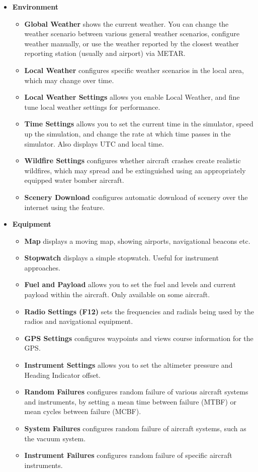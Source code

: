 \begin{itemize}
\item \textbf{Environment}
 \begin{itemize}

  \item \textbf{Global Weather} shows the current weather.
  You can change the weather scenario between various general weather scenarios,
  configure weather manually,
  or use the weather reported by the closest weather reporting station (usually
  and airport) via METAR.
  \item \textbf{Local Weather} configures specific weather scenarios in
  the local area, which may change over time.
  \item \textbf{Local Weather Settings } allows you enable Local Weather, and fine tune local weather
  settings for performance.
  \item \textbf{Time Settings} allows you to set the current
time in the simulator, speed up the simulation, and change the rate at which
time passes in the simulator. Also displays UTC and local time.
  \item \textbf{Wildfire Settings} configures whether aircraft crashes create realistic
  wildfires, which may spread and be extinguished using an appropriately equipped water
  bomber aircraft.
  \item \textbf{Scenery Download} configures automatic download of scenery over the internet
  using the \TerraSync{} feature.
 \end{itemize}

\item \textbf{Equipment}
 \begin{itemize}
  \item \textbf{Map} displays a moving map, showing airports, navigational beacons etc.
  \item \textbf{Stopwatch} displays a simple stopwatch. Useful for instrument
approaches.
  \item \textbf{Fuel and Payload} allows you to
set the fuel and levels and current payload within the aircraft. Only available on
some aircraft.
  \item \textbf{Radio Settings (F12)} sets the frequencies and radials being used by
  the radios and navigational equipment.
  \item \textbf{GPS Settings}  configures waypoints and views course information for the GPS.
  \item \textbf{Instrument Settings}  allows you to set the
altimeter pressure and Heading Indicator offset.
  \item \textbf{Random Failures} configures random failure of various
aircraft systems and instruments, by setting a mean time between failure (MTBF) or mean cycles
between failure (MCBF).
  \item \textbf{System Failures} configures random failure of aircraft systems, such as the vacuum
  system.
  \item \textbf{Instrument Failures} configures random failure of specific aircraft instruments.
 \end{itemize}


\end{itemize}
